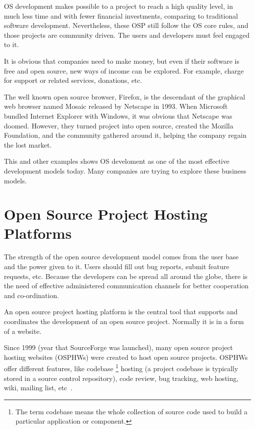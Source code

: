 OS development makes possible to a project to reach a high quality level,
in much less time and with fewer financial investments, comparing to traditional software development.
Nevertheless, these OSP still follow the OS core rules, 
and those projects are community driven. The users and developers must feel engaged to it.

It is obvious that companies need to make money, 
but even if their software is free and open source, new ways of income can be explored. 
For example, charge for support or related services, donations, etc. 

 The well known open source browser, Firefox, 
is the descendant of the graphical web browser named Mosaic released by Netscape in 1993.
When Microsoft bundled Internet Explorer with Windows, it was obvious that Netscape was doomed.
However, they turned project into open source, created the Mozilla Foundation, 
and the community gathered around it, helping the company regain the lost market. 

This and other examples shows OS develoment as one of the most effective development models today. 
Many companies are trying to explore these business models.


\section{Open Source Project Hosting Platforms}

The strength of the open source development model comes from the user base and the power given to it. 
Users should fill out bug reports, submit feature requests, etc. 
Because the developers can be spread all around the globe, there is the need of effective administered communication channels
for better cooperation and co-ordination. 

An open source project hosting platform is the central tool that supports and coordinates the development of an open source project.
Normally it is in a form of a website.

Since 1999 (year that SourceForge was launched), many open source project hosting websites (OSPHWs) were created to host open source projects.
OSPHWs offer different features, 
like codebase \footnote{The term codebase means the whole collection of source code used to build a particular application or component.} 
hosting (a project codebase is typically stored in a source control repository), 
code review, bug tracking, web hosting, wiki, mailing list, etc~\cite{binkley2006animated}.

